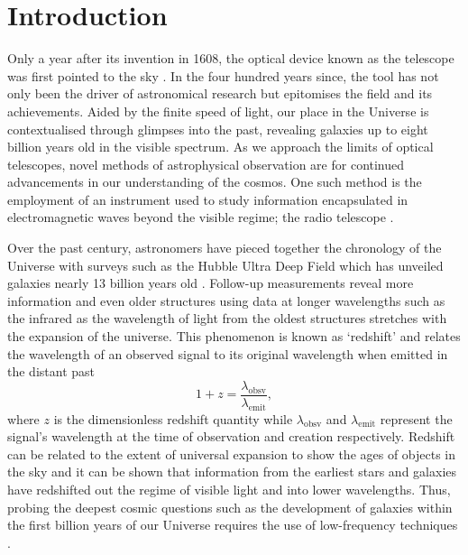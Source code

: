 
\chapter{Introduction}

\ifpdf
    \graphicspath{{introduction/figs/Raster/}{introduction/figs/PDF/}{introduction/figs/}}
\else
    \graphicspath{{introduction/figs/Vector/}{introduction/figs/}}
\fi


Only a year after its invention in 1608, the optical device known as the telescope was first pointed to the sky \citep{histTel}. In the four hundred years since, the tool has not only been the driver of astronomical research but epitomises the field and its achievements. Aided by the finite speed of light, our place in the Universe is contextualised through glimpses into the past, revealing galaxies up to eight billion years old in the visible spectrum. As we approach the limits of optical telescopes, novel methods of astrophysical observation are for continued advancements in our understanding of the cosmos. One such method is the employment of an instrument used to study information encapsulated in electromagnetic waves beyond the visible regime; the radio telescope \citep{smithObsAst}.

Over the past century, astronomers have pieced together the chronology of the Universe with surveys such as the Hubble Ultra Deep Field which has unveiled galaxies nearly 13 billion years old \citep{hudf}. Follow-up measurements reveal more information and even older structures using data at longer wavelengths such as the infrared \citep{abyss} as the wavelength of light from the oldest structures stretches with the expansion of the universe. This phenomenon is known as ‘redshift’ and relates the wavelength of an observed signal to its original wavelength when emitted in the distant past
\begin{equation}
    \label{eqn:redshift}
    1 + z = \frac{ \lambda_{\mathrm{obsv}} }{ \lambda_{\mathrm{emit}} },
\end{equation}
where $z$ is the dimensionless redshift quantity while $\lambda_{\mathrm{obsv}}$ and $\lambda_{\mathrm{emit}}$ represent the signal's wavelength at the time of observation and creation respectively. Redshift can be related to the extent of universal expansion to show the ages of objects in the sky and it can be shown that information from the earliest stars and galaxies have redshifted out the regime of visible light and into lower wavelengths. Thus, probing the deepest cosmic questions such as the development of galaxies within the first billion years of our Universe requires the use of low-frequency techniques \cite{furPhys}.


